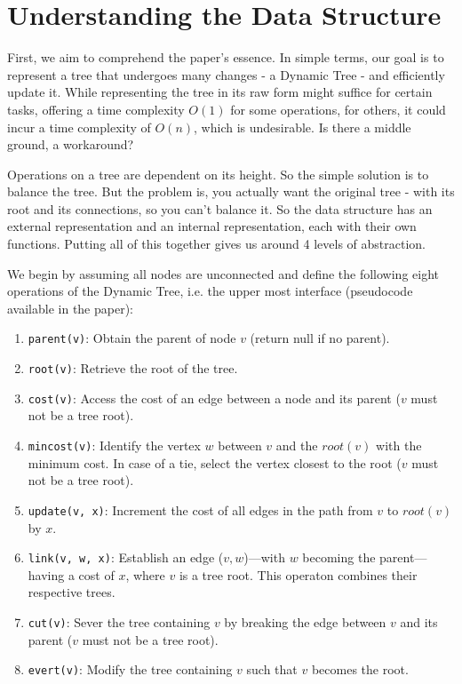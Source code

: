 \documentclass[a4paper, 11pt]{article}
\begin{document}
\section{Understanding the Data Structure}
First, we aim to comprehend the paper's essence. In simple terms, our goal is to represent a tree that undergoes many changes - a Dynamic Tree - and efficiently update it. While representing the tree in its raw form might suffice for certain tasks, offering a time complexity $O(1)$ for some operations, for others, it could incur a time complexity of $O(n)$, which is undesirable. Is there a middle ground, a workaround?

Operations on a tree are dependent on its height. So the simple solution is to balance the tree. But the problem is, you actually want the original tree - with its root and its connections, so you can’t balance it. So the data structure has an external representation and an internal representation, each with their own functions. Putting all of this together gives us around 4 levels of abstraction.

We begin by assuming all nodes are unconnected and define the following eight operations of the Dynamic Tree, i.e. the upper most interface (pseudocode available in the paper):
\begin{enumerate}
    \item \texttt{parent(v)}: Obtain the parent of node \(v\) (return null if no parent).
    \item \texttt{root(v)}: Retrieve the root of the tree.
    \item \texttt{cost(v)}: Access the cost of an edge between a node and its parent (\(v\) must not be a tree root).
    \item \texttt{mincost(v)}: Identify the vertex \(w\) between \(v\) and the $root(v)$ with the minimum cost. In case of a tie, select the vertex closest to the root (\(v\) must not be a tree root).
    \item \texttt{update(v, x)}: Increment the cost of all edges in the path from \(v\) to $root(v)$ by \(x\).
    \item \texttt{link(v, w, x)}: Establish an edge (\(v, w\))—with \(w\) becoming the parent—having a cost of \(x\), where \(v\) is a tree root. This operaton combines their respective trees.
    \item \texttt{cut(v)}: Sever the tree containing \(v\) by breaking the edge between \(v\) and its parent (\(v\) must not be a tree root).
    \item \texttt{evert(v)}: Modify the tree containing \(v\) such that \(v\) becomes the root.
\end{enumerate}
\end{document}
